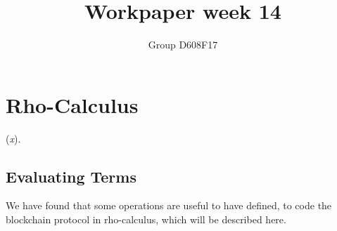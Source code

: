 

\setlength{\parindent}{0pt}
\author{Group D608F17}
\title{Workpaper week 14}



\maketitle
\section{Rho-Calculus}
(\textit{x}).





\subsection{Evaluating Terms}
We have found that some operations are useful to have defined, to code the blockchain protocol in rho-calculus, which will be described here.









\grid
\grid
